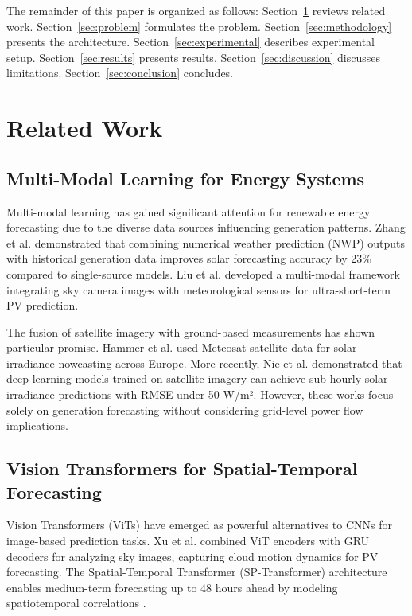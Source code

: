 \documentclass[journal,12pt,onecolumn]{IEEEtran}
\begin{document}
The remainder of this paper is organized as follows: Section~\ref{sec:related_work} reviews related work. Section~\ref{sec:problem} formulates the problem. Section~\ref{sec:methodology} presents the architecture. Section~\ref{sec:experimental} describes experimental setup. Section~\ref{sec:results} presents results. Section~\ref{sec:discussion} discusses limitations. Section~\ref{sec:conclusion} concludes.

\section{Related Work}
\label{sec:related_work}

\subsection{Multi-Modal Learning for Energy Systems}

Multi-modal learning has gained significant attention for renewable energy forecasting due to the diverse data sources influencing generation patterns. Zhang et al. \cite{ref9} demonstrated that combining numerical weather prediction (NWP) outputs with historical generation data improves solar forecasting accuracy by 23\% compared to single-source models. Liu et al. \cite{ref10} developed a multi-modal framework integrating sky camera images with meteorological sensors for ultra-short-term PV prediction.

The fusion of satellite imagery with ground-based measurements has shown particular promise. Hammer et al. \cite{ref11} used Meteosat satellite data for solar irradiance nowcasting across Europe. More recently, Nie et al. \cite{ref12} demonstrated that deep learning models trained on satellite imagery can achieve sub-hourly solar irradiance predictions with RMSE under 50 W/m². However, these works focus solely on generation forecasting without considering grid-level power flow implications.

\subsection{Vision Transformers for Spatial-Temporal Forecasting}

Vision Transformers (ViTs) have emerged as powerful alternatives to CNNs for image-based prediction tasks. Xu et al. \cite{ref13} combined ViT encoders with GRU decoders for analyzing sky images, capturing cloud motion dynamics for PV forecasting. The Spatial-Temporal Transformer (SP-Transformer) architecture enables medium-term forecasting up to 48 hours ahead by modeling spatiotemporal correlations \cite{ref14}.
\end{document}
